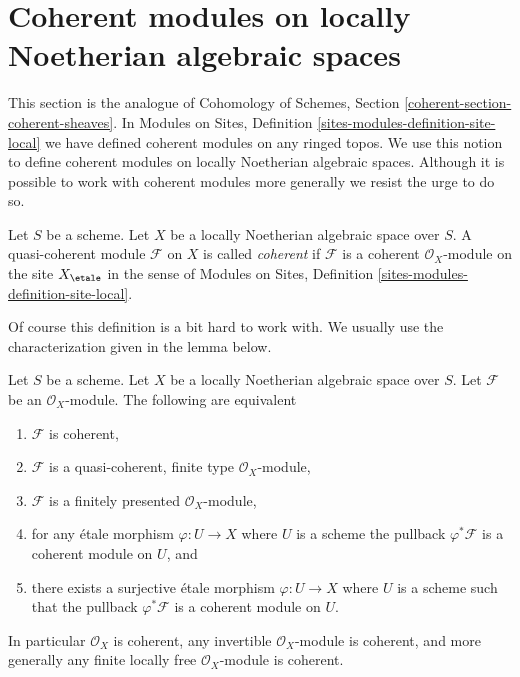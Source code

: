 \section{Coherent modules on locally Noetherian algebraic spaces}
\label{section-coherent}

\noindent
This section is the analogue of
Cohomology of Schemes, Section \ref{coherent-section-coherent-sheaves}.
In Modules on Sites, Definition \ref{sites-modules-definition-site-local}
we have defined coherent modules on any ringed topos. We use this notion
to define coherent modules on locally Noetherian algebraic spaces.
Although it is possible to work with coherent modules more generally
we resist the urge to do so.

\begin{definition}
\label{definition-coherent}
Let $S$ be a scheme. Let $X$ be a locally Noetherian algebraic space over $S$.
A quasi-coherent module $\mathcal{F}$ on $X$ is called {\it coherent}
if $\mathcal{F}$ is a coherent $\mathcal{O}_X$-module on the site
$X_\etale$ in the sense of
Modules on Sites, Definition \ref{sites-modules-definition-site-local}.
\end{definition}

\noindent
Of course this definition is a bit hard to work with. We usually use
the characterization given in the lemma below.

\begin{lemma}
\label{lemma-coherent-Noetherian}
Let $S$ be a scheme.
Let $X$ be a locally Noetherian algebraic space over $S$.
Let $\mathcal{F}$ be an $\mathcal{O}_X$-module.
The following are equivalent
\begin{enumerate}
\item $\mathcal{F}$ is coherent,
\item $\mathcal{F}$ is a quasi-coherent, finite type $\mathcal{O}_X$-module,
\item $\mathcal{F}$ is a finitely presented $\mathcal{O}_X$-module,
\item for any \'etale morphism $\varphi : U \to X$ where $U$ is a scheme
the pullback $\varphi^*\mathcal{F}$ is a coherent module on $U$, and
\item there exists a surjective \'etale morphism $\varphi : U \to X$
where $U$ is a scheme such that the pullback $\varphi^*\mathcal{F}$ is
a coherent module on $U$.
\end{enumerate}
In particular $\mathcal{O}_X$ is coherent, any invertible
$\mathcal{O}_X$-module is coherent, and more generally any
finite locally free $\mathcal{O}_X$-module is coherent.
\end{lemma}

